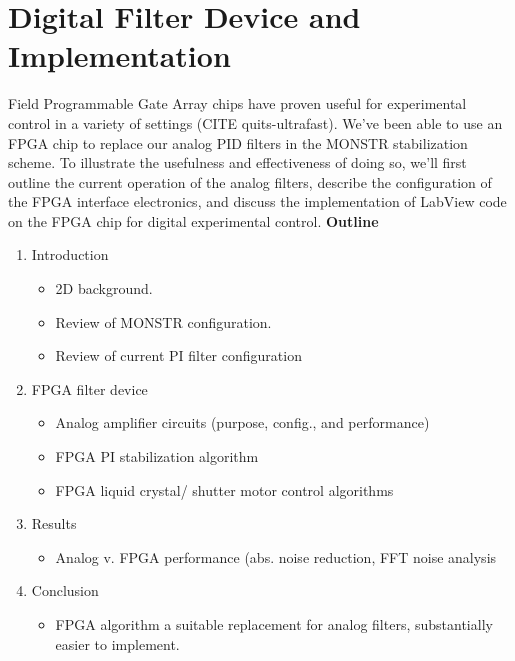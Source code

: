 \documentclass[letterpaper,12pt,amsmath,reprint,aip,jmp,twocolumn]{revtex4-1}
\begin{document}
\section{Digital Filter Device and Implementation}
\indent Field Programmable Gate Array chips have proven useful for experimental control in a variety of settings (CITE quits-ultrafast). We've been able to use an FPGA chip to replace our analog PID filters in the MONSTR stabilization scheme. To illustrate the usefulness and effectiveness of doing so, we'll first outline the current operation of the analog filters,  describe the configuration of the FPGA interface electronics, and discuss the implementation of LabView code on the FPGA chip for digital experimental control.
\Large{\textbf{Outline}}\\
\begin{enumerate}
\item Introduction
\begin{itemize}
\item 2D background.
\item Review of MONSTR configuration.
\item Review of current PI filter configuration
\end{itemize}
\item FPGA filter device
\begin{itemize}
\item Analog amplifier circuits (purpose, config., and performance)
\item FPGA PI stabilization algorithm
\item FPGA liquid crystal/ shutter motor control algorithms
\end{itemize}

\item Results
\begin{itemize}
\item Analog v. FPGA performance (abs. noise reduction, FFT noise analysis
\end{itemize}
\item Conclusion
\begin{itemize}
\item FPGA algorithm a suitable replacement for analog filters, substantially easier to implement.
\end{itemize}
\end{enumerate}
\end{document}
